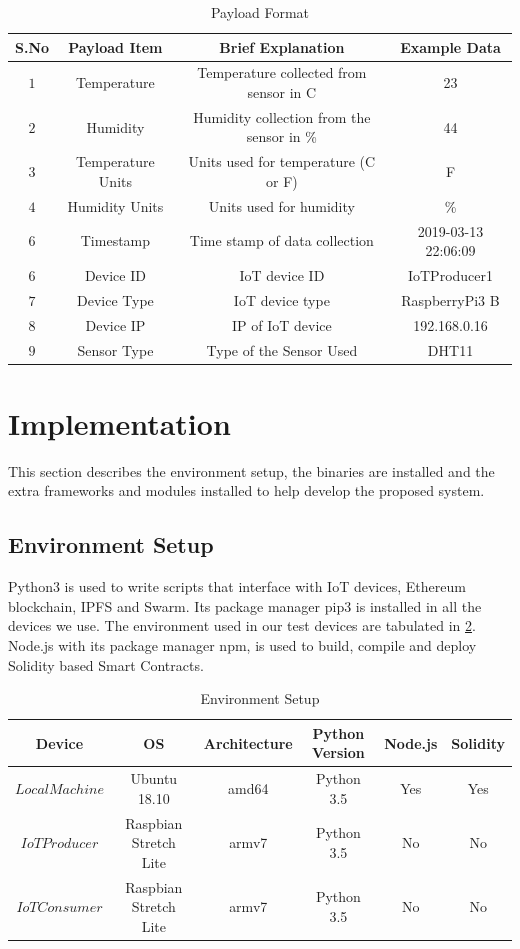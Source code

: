\documentclass[11pt,openright]{report}
\begin{document}
\begin{table}[!htbp]
	\renewcommand{\arraystretch}{1.3}
	\caption{Payload Format}
	\label{payload_format}
	\centering
	\begin{tabular}{|c|c|c|c|}
		\hline
		\bfseries S.No & \bfseries Payload Item & \bfseries Brief Explanation & \bfseries Example Data \\
		\hline\hline
		$1$ & Temperature & Temperature collected from sensor in C & 23 \\ \hline
		$2$ & Humidity & Humidity collection from the sensor in \% & 44 \\ \hline
		$3$ & Temperature Units & Units used for temperature (C or F) & F \\ \hline
		$4$ & Humidity Units & Units used for humidity & \% \\ \hline
		$6$ & Timestamp & Time stamp of data collection & 2019-03-13 22:06:09 \\ \hline
		$6$ & Device ID & IoT device ID & IoTProducer1 \\ \hline
		$7$ & Device Type & IoT device type & RaspberryPi3 B \\ \hline
		$8$ & Device IP & IP of IoT device& 192.168.0.16 \\ \hline
		$9$ & Sensor Type & Type of the Sensor Used & DHT11 \\ \hline
	\end{tabular}
\end{table}


\section{Implementation}
This section describes the environment setup, the binaries are installed and the extra frameworks and modules installed to help develop the proposed system.
\subsection{Environment Setup}
Python3 is used to write scripts that interface with IoT devices, Ethereum blockchain, IPFS and Swarm. Its package manager pip3 is installed in all the devices we use. The environment used in our test devices are tabulated in \ref{environment_setup}. Node.js with its package manager npm, is used to build, compile and deploy Solidity based Smart Contracts. 

\begin{table}[!htbp]
	\renewcommand{\arraystretch}{1}
	\caption{Environment Setup}
	\label{environment_setup}
	\centering
	\begin{tabular}{|c|c|c|c|c|c|}
		\hline
		\bfseries Device & \bfseries OS & \bfseries Architecture & \bfseries Python Version & \bfseries Node.js & \bfseries Solidity\\
		\hline\hline
		$Local Machine$ & Ubuntu 18.10 & amd64 & Python 3.5 &  Yes & Yes\\ \hline
		$IoT Producer$ & Raspbian Stretch Lite & armv7 & Python 3.5 &  No & No\\ \hline
		$IoT Consumer$ & Raspbian Stretch Lite & armv7 & Python 3.5 &  No & No\\ \hline
	\end{tabular}
\end{table}
\end{document}

